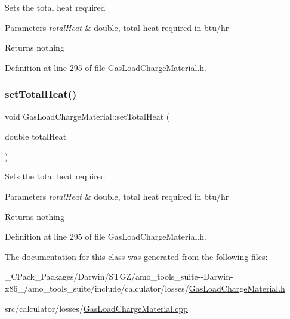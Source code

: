 Sets the total heat required


\begin{DoxyParams}{Parameters}
{\em total\+Heat} & double, total heat required in btu/hr\\
\hline
\end{DoxyParams}
\begin{DoxyReturn}{Returns}
nothing 
\end{DoxyReturn}


Definition at line 295 of file Gas\+Load\+Charge\+Material.\+h.

\mbox{\label{class_gas_load_charge_material_aae01f6f4f923965c111e1dac66eb8365}} 
\subsubsection{\texorpdfstring{set\+Total\+Heat()}{setTotalHeat()}\hspace{0.1cm}{\footnotesize\ttfamily [3/3]}}
{\footnotesize\ttfamily void Gas\+Load\+Charge\+Material\+::set\+Total\+Heat (\begin{DoxyParamCaption}\item[{double}]{total\+Heat }\end{DoxyParamCaption})\hspace{0.3cm}{\ttfamily [inline]}}

Sets the total heat required


\begin{DoxyParams}{Parameters}
{\em total\+Heat} & double, total heat required in btu/hr\\
\hline
\end{DoxyParams}
\begin{DoxyReturn}{Returns}
nothing 
\end{DoxyReturn}


Definition at line 295 of file Gas\+Load\+Charge\+Material.\+h.



The documentation for this class was generated from the following files\+:\begin{DoxyCompactItemize}
\item 
\+\_\+\+C\+Pack\+\_\+\+Packages/\+Darwin/\+S\+T\+G\+Z/amo\+\_\+tools\+\_\+suite-\/-\/\+Darwin-\/x86\+\_/amo\+\_\+tools\+\_\+suite/include/calculator/losses/\hyperlink{___c_pack___packages_2_darwin_2_s_t_g_z_2amo__tools__suite--_darwin-x86__64_2amo__tools__suite_26a031588b5d802b3ba6009030a7c132e}{Gas\+Load\+Charge\+Material.\+h}\item 
src/calculator/losses/\hyperlink{_gas_load_charge_material_8cpp}{Gas\+Load\+Charge\+Material.\+cpp}\end{DoxyCompactItemize}
